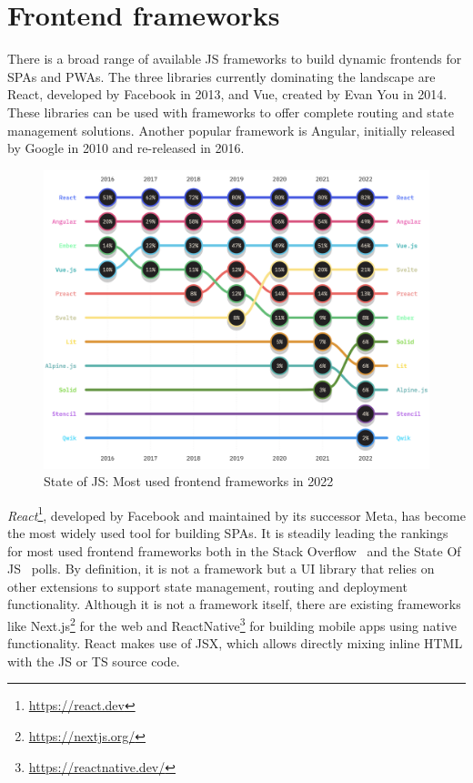 \section{Frontend frameworks}
\label{sec:frontend-frameworks}

There is a broad range of available \ac{JS} frameworks to build dynamic frontends for \ac{SPA}s and \ac{PWA}s. The three libraries currently dominating the landscape are React, developed by Facebook in 2013, and Vue, created by Evan You in 2014.
These libraries can be used with frameworks to offer complete routing and state management solutions.
Another popular framework is Angular, initially released by Google in 2010 and re-released in 2016.

\begin{figure}[h]
    \centering
    \includegraphics[scale=0.4]{04_Artefakte/01_Abbildungen/stateofjs-usage-frontend-frameworks-2022}
    \caption[Most used frontend frameworks in 2022]{State of JS: Most used frontend frameworks in 2022 \parencite{mostUsedFrontendFrameworks22}\protect}
    \label{fig:mostUsedFrameworks}
\end{figure}

\emph{React}\footnote{\url{https://react.dev}}, developed by Facebook and maintained by its successor Meta, has become the most widely used tool for building \ac{SPA}s.
It is steadily leading the rankings for most used frontend frameworks both in the Stack Overflow~\parencite{stackOverflowPollWebFrameworks23} and the State Of JS~\parencite{mostUsedFrontendFrameworks22} polls.
By definition, it is not a framework but a \ac{UI} library that relies on other extensions to support state management, routing and deployment functionality.
Although it is not a framework itself, there are existing frameworks like Next.js\footnote{\url{https://nextjs.org/}} for the web and ReactNative\footnote{\url{https://reactnative.dev/}} for building mobile apps using native functionality.
React makes use of \ac{JSX}, which allows directly mixing inline \ac{HTML} with the \ac{JS} or \ac{TS} source code.

